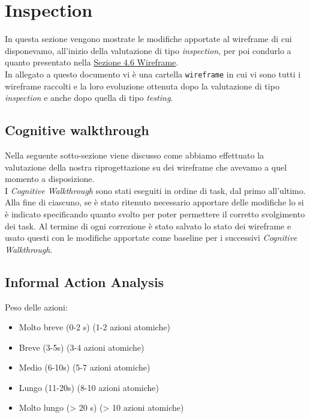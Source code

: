\section{Inspection}
\label{s:inspection}

In questa sezione vengono mostrate le modifiche apportate al wireframe di cui disponevamo, all'inizio della valutazione di tipo \textit{inspection}, per poi condurlo a quanto presentato nella \hyperref[s:wireframe]{Sezione 4.6 Wireframe}.\\
In allegato a questo documento vi è una cartella \texttt{wireframe} in cui vi sono tutti i wireframe raccolti e la loro evoluzione ottenuta dopo la valutazione di tipo \textit{inspection} e anche dopo quella di tipo \textit{testing}.

\subsection{Cognitive walkthrough}
\label{ss:cognitive-walkthrough}

Nella seguente sotto-sezione viene discusso come abbiamo effettuato la valutazione della nostra riprogettazione su dei wireframe che avevamo a quel momento a disposizione.\\
I \textit{Cognitive Walkthrough} sono stati eseguiti in ordine di task, dal primo all'ultimo. Alla fine di ciascuno, se è stato ritenuto necessario apportare delle modifiche lo si è indicato specificando quanto svolto per poter permettere il corretto svolgimento dei task.
Al termine di ogni correzione è stato salvato lo stato dei wireframe e usato questi con le modifiche apportate come baseline per i successivi \textit{Cognitive Walkthrough}.\\








\subsection{Informal Action Analysis}
\label{ss:informal-action-analysis}
Peso delle azioni:
\begin{itemize}
    \item Molto breve (0-2 s) (1-2 azioni atomiche)
    \item Breve (3-5s) (3-4 azioni atomiche)
    \item Medio (6-10s) (5-7 azioni atomiche)
    \item Lungo (11-20s) (8-10 azioni atomiche)
    \item Molto lungo (> 20 s) (> 10 azioni atomiche)
\end{itemize}

